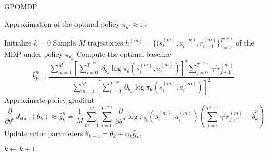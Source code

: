 \begin{algorithm}[t]
	\caption{GPOMDP}
	\label{algo:GPOMDP}
	\begin{algorithmic}[0]
		\Ensure Approximation of the optimal policy $\pi_{\theta^*} \approx \pi_*$
		\begin{algorithmic}[1]
		\State Initialize $k = 0$
		\Repeat
			\State Sample $M$ trajectories $h^{(m)} = \{(s_t^{(m)}, a_t^{(m)}, r_{t+1}^{(m)}\}_{t = 0}^{T^{(m)}}$ of the MDP under policy $\pi_{\theta_k}$
			\State Compute the optimal baseline 
			\begin{equation}
				\widehat{b}_k^n = \frac{\sum^{M}_{m=1} \left[ \sum_{i=0}^{T^{(m)}} 
									\partial_{\theta_k} \log \pi_\theta\left(s_i^{(m)}, a_i^{(m)}\right) \right]^2 
									\sum^{T^{(m)}}_{j=0} \gamma^j r_{j+1}^{(m)}}{\sum^{M}_{m=1} \left[ \sum_{i=0}^{T^{(m)}} \partial_{\theta_k} \log \pi_\theta\left(s_i^{(m)}, a_i^{(m)}\right) \right]^2}
			\end{equation}
			\State Approximate policy gradient
			\begin{equation}
				\frac{\partial}{\partial\theta^n} J_{\text{start}}(\theta_k) \approx \widehat{g}_k^n = \frac{1}{M} \sum^{M}_{m=1} \sum_{i=0}^{T^{(m)}} 
					\frac{\partial}{\partial\theta^n} \log \pi_{\theta_k}\left(s_i^{(m)}, a_i^{(m)}\right) \left( 
					\sum^{T^{(m)}}_{j=i} \gamma^j r_{j+1}^{(m)} - \widehat{b}_k^n \right)
			\end{equation}
			\State Update actor parameters $\theta_{k+1} = \theta_k + \alpha_k \widehat{g}_k $. 
			
			\State $k \leftarrow k + 1$
		\end{algorithmic}
	\end{algorithmic}
\end{algorithm}

